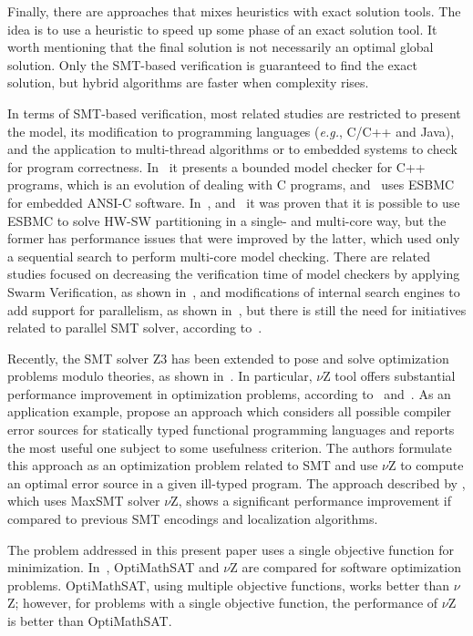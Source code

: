 \documentclass{doublecol-new}
\theoremstyle{TH}{
\newtheorem{lemma}{Lemma}
\newtheorem{theorem}[lemma]{Theorem}
\newtheorem{corrolary}[lemma]{Corrolary}
\newtheorem{conjecture}[lemma]{Conjecture}
\newtheorem{proposition}[lemma]{Proposition}
\newtheorem{claim}[lemma]{Claim}
\newtheorem{stheorem}[lemma]{Wrong Theorem}
\newtheorem{algorithm}{Algorithm}
}
\theoremstyle{THrm}{
\newtheorem{definition}{Definition}[section]
\newtheorem{question}{Question}[section]
\newtheorem{remark}{Remark}
\newtheorem{scheme}{Scheme}
}
\theoremstyle{THhit}{
\newtheorem{case}{Case}[section]
}
\begin{document}
Finally, there are approaches that mixes heuristics with exact solution tools. The idea is to use a heuristic to speed up some phase of an exact solution tool. It worth mentioning that the final solution is not necessarily an optimal global solution. Only the SMT-based verification is guaranteed to find the exact solution, but hybrid algorithms are faster when complexity rises.

In terms of SMT-based verification, most related studies are restricted to present the model, its modification to programming languages ({\it e.g.}, C/C++ and Java), and the application to multi-thread algorithms or to embedded systems to check for program correctness. In~\cite{Ramalho2013} it presents a bounded model checker for C++ programs, which is an evolution of dealing with C programs, and~\cite{Cordeiro2012} uses ESBMC for embedded ANSI-C software. In~\cite{Trindade2015}, and~\cite{Trindade2016} it was proven that it is possible to use ESBMC to solve HW-SW partitioning in a single- and multi-core way, but the former has performance issues that were improved by the latter, which used only a sequential search to perform multi-core model checking. There are related studies focused on decreasing the verification time of model checkers by applying Swarm Verification, as shown in~\cite{Holzmann2011}, and modifications of internal search engines to add support for parallelism, as shown in~\cite{Holzmann2012}, but there is still the need for initiatives related to parallel SMT solver, according to~\cite{Wintersteiger2009}. 

Recently, the SMT solver Z3 has been extended to pose and solve optimization problems modulo theories, as shown in~\cite{Bjorner2015}. In particular, $\nu$Z tool offers substantial performance improvement in optimization problems, according to~\cite{Bjorner2014} and~\cite{Bjorner2015}. As an application example, \cite{Pavlinovic2015} propose an approach which considers all possible compiler error sources for statically typed functional programming languages and reports the most useful one subject to some usefulness criterion. The authors formulate this approach as an optimization problem related to SMT and use $\nu$Z to compute an optimal error source in a given ill-typed program. The approach described by \cite{Pavlinovic2015}, which uses MaxSMT solver $\nu$Z, shows a significant performance improvement if compared to previous SMT encodings and localization algorithms.

The problem addressed in this present paper uses a single objective function for minimization. In~\cite{Patrick2015}, OptiMathSAT and $\nu$Z are compared for software optimization problems. OptiMathSAT, using multiple objective functions, works better than $\nu$Z; however, for problems with a single objective function, the performance of $\nu$Z is better than OptiMathSAT.
\end{document}
